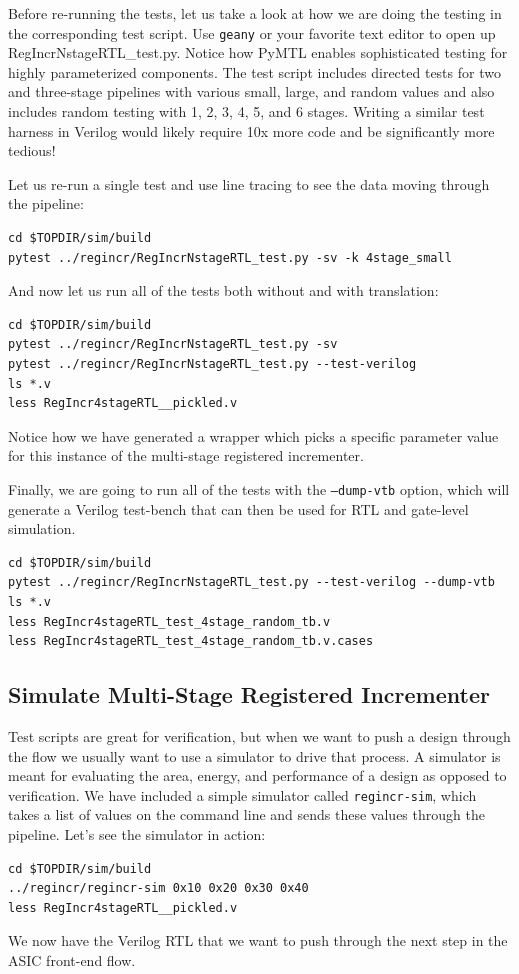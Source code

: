 \documentclass[a4paper,12pt,twoside]{article}
\begin{document}
Before re-running the tests, let us take a look at how we are doing the testing in the corresponding test script. Use \texttt{geany} or your favorite text editor to open up RegIncrNstageRTL\_test.py. Notice how PyMTL enables sophisticated testing for highly parameterized components. The test script includes directed tests for two and three-stage pipelines with various small, large, and random values and also includes random testing with 1, 2, 3, 4, 5, and 6 stages. Writing a similar test harness in Verilog would likely require 10x more code and be significantly more tedious!

Let us re-run a single test and use line tracing to see the data moving through the pipeline:
\begin{verbatim}
cd $TOPDIR/sim/build
pytest ../regincr/RegIncrNstageRTL_test.py -sv -k 4stage_small
\end{verbatim}
And now let us run all of the tests both without and with translation:
\begin{verbatim}
cd $TOPDIR/sim/build
pytest ../regincr/RegIncrNstageRTL_test.py -sv
pytest ../regincr/RegIncrNstageRTL_test.py --test-verilog
ls *.v
less RegIncr4stageRTL__pickled.v
\end{verbatim}
Notice how we have generated a wrapper which picks a specific parameter value for this instance of the multi-stage registered incrementer.

Finally, we are going to run all of the tests with the \texttt{--dump-vtb} option, which will generate a Verilog test-bench that can then be used for RTL and gate-level simulation.
\begin{verbatim}
cd $TOPDIR/sim/build
pytest ../regincr/RegIncrNstageRTL_test.py --test-verilog --dump-vtb
ls *.v
less RegIncr4stageRTL_test_4stage_random_tb.v
less RegIncr4stageRTL_test_4stage_random_tb.v.cases
\end{verbatim}
\subsection{Simulate Multi-Stage Registered Incrementer}\label{SPyMTL3}
Test scripts are great for verification, but when we want to push a design through the flow we usually want to use a simulator to drive that process. A simulator is meant for evaluating the area, energy, and performance of a design as opposed to verification. We have included a simple simulator called \texttt{regincr-sim}, which takes a list of values on the command line and sends these values through the pipeline. Let’s see the simulator in action:
\begin{verbatim}
cd $TOPDIR/sim/build
../regincr/regincr-sim 0x10 0x20 0x30 0x40
less RegIncr4stageRTL__pickled.v
\end{verbatim}
We now have the Verilog RTL that we want to push through the next step in the ASIC front-end flow.
\end{document}
